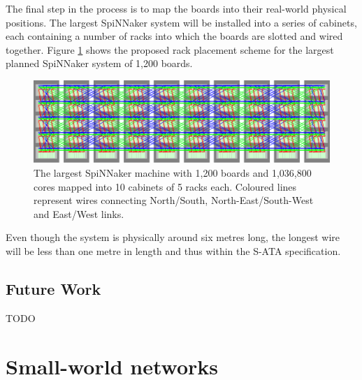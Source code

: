 			\label{sec:mapping-spinnaker-to-cabinets}
			
			The final step in the process is to map the boards into their real-world
			physical positions. The largest SpiNNaker system will be installed into a
			series of cabinets, each containing a number of racks into which the
			boards are slotted and wired together. Figure \ref{fig:spinnaker106} shows
			the proposed rack placement scheme for the largest planned SpiNNaker system
			of 1,200 boards.
			
			\begin{figure}
				\center
				\includegraphics[width=\textwidth]{figures/spinnaker106}
				\caption[SpiNNaker machine mapped into cabinets and racks.]{The largest
				SpiNNaker machine with 1,200 boards and 1,036,800 cores mapped into 10
				cabinets of 5 racks each.  Coloured lines represent wires connecting
				{\color{red}North/South}, {\color{green}North-East/South-West} and
				{\color{blue}East/West} links.}
				\label{fig:spinnaker106}
			\end{figure}
			
			Even though the system is physically around six metres long, the longest
			wire will be less than one metre in length and thus within the S-ATA
			specification.
		
		\subsection{Future Work}
			
			
			TODO
	
	
	\section{Small-world networks}
		
		
